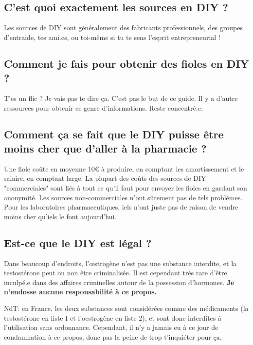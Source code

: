 \documentclass{article}
\begin{document}
\subsection{C'est quoi exactement les sources en DIY ?}

Les sources de DIY sont généralement des fabricants professionnels, des groupes d'entraide, tes ami.es, ou toi-même si tu te sens l'esprit entrepreneurial !

\subsection{Comment je fais pour obtenir des fioles en DIY ?}

T'es un flic ? Je vais pas te dire ça. C'est pas le but de ce guide. Il y a d'autre ressources pour obtenir ce genre d'informations. Reste concentré.e.

\subsection{Comment ça se fait que le DIY puisse être moins cher que d'aller à la pharmacie ?}

Une fiole coûte en moyenne 10€ à produire, en comptant les amortissement et le salaire, en comptant large. La plupart des coûts des sources de DIY "commerciales" sont liés à tout ce qu'il faut pour envoyer les fioles en gardant son anonymité. Les sources non-commerciales n'ont sûrement pas de tels problèmes. Pour les laboratoires pharmaceutiques, iels n'ont juste pas de raison de vendre moins cher qu'iels le font aujourd'hui.  

\subsection{Est-ce que le DIY est légal ?}\label{6-11}

Dans beaucoup d'endroits, l'œstrogène n'est pas une substance interdite, et la testostérone peut ou non être criminalisée. Il est cependant très rare d'être inculpé.e dans des affaires criminelles autour de la possession d'hormones. \textbf{Je n'endosse aucune responsabilité à ce propos.} 

NdT: en France, les deux substances sont considérées comme des médicaments (la testostérone en liste I et l'oestrogène en liste 2), et sont donc interdites à l'utilisation sans ordonnance. Cependant, il n'y a jamais eu à ce jour de condamnation à ce propos, donc pas la peine de trop t'inquiéter pour ça.
\end{document}
